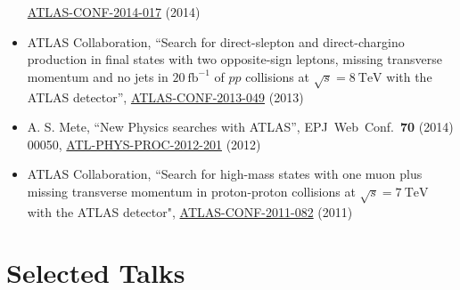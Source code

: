 \documentclass[a4paper,10pt]{article}
\begin{document}
\begin{itemize}
	\href{https://atlas.web.cern.ch/Atlas/GROUPS/PHYSICS/CONFNOTES/ATLAS-CONF-2014-017/}{ATLAS-CONF-2014-017} (2014) 
	\item ATLAS Collaboration, 
	``Search for direct-slepton and direct-chargino production in final states with two opposite-sign leptons, missing transverse momentum 
	and no jets in $20\ \mathrm{fb}^{-1}$ of $pp$ collisions at $\sqrt{s} = 8\ \mathrm{TeV}$ with the ATLAS detector'', 
	\href{https://atlas.web.cern.ch/Atlas/GROUPS/PHYSICS/CONFNOTES/ATLAS-CONF-2013-049/}{ATLAS-CONF-2013-049} (2013) 
	\item A. S. Mete, 
	``New Physics searches with ATLAS'', 
	EPJ\ Web\ Conf.\ {\bf 70} (2014) 00050, 
	\href{https://cds.cern.ch/record/1478973}{ATL-PHYS-PROC-2012-201} (2012)
	\item ATLAS Collaboration, 
	``Search for high-mass states with one muon plus missing transverse momentum in proton-proton collisions at $\sqrt{s} = 7\ \mathrm{TeV}$ with the ATLAS detector", 
	\href{https://atlas.web.cern.ch/Atlas/GROUPS/PHYSICS/CONFNOTES/ATLAS-CONF-2011-082/}{ATLAS-CONF-2011-082} (2011)
\end{itemize}

\section{Selected Talks}

\vspace{1mm}
\end{document}
